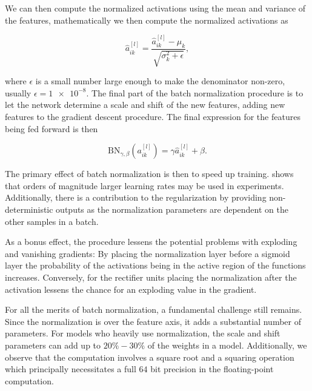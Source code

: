 \noindent We can then compute the normalized activations using the mean and variance of the features, mathematically we then compute the normalized activations as 

\begin{equation}
\hat{a}_{ik}^{[l]} = \frac{\hat{a}_{ik}^{[l]} - \mu_k}{\sqrt{\sigma_k^2 + \epsilon}},
\end{equation}

\noindent where $\epsilon$ is a small number large enough to make the denominator non-zero, usually $\epsilon = \num{1e-8}$. The final part of the batch normalization procedure is to let the network determine a scale and shift of the new features, adding new features to the gradient descent procedure. The final expression for the features being fed forward is then 

\begin{equation}\label{eq:bn}
\text{BN}_{\gamma, \beta}(a_{ik}^{[l]}) = \gamma  \hat{a}_{ik}^{[l]} + \beta.
\end{equation} 

\noindent The primary effect of batch normalization is then to speed up training. \cite{Ioffe2015} shows that orders of magnitude larger learning rates may be used in experiments. Additionally, there is a contribution to the regularization by providing non-deterministic outputs as the normalization parameters are dependent on the other samples in a batch. 

As a bonus effect, the procedure lessens the potential problems with exploding and vanishing gradients: By placing the normalization layer before a sigmoid layer the probability of the activations being in the active region of the functions increases. Conversely, for the rectifier units placing the normalization after the activation lessens the chance for an exploding value in the gradient.

For all the merits of batch normalization, a fundamental challenge still remains. Since the normalization is over the feature axis, it adds a substantial number of parameters. For models who heavily use normalization, the scale and shift parameters can add up to $20\%-30\%$ of the weights in a model. Additionally, we observe that the computation involves a square root and a squaring operation which principally necessitates a full $64$ bit precision in the floating-point computation. 